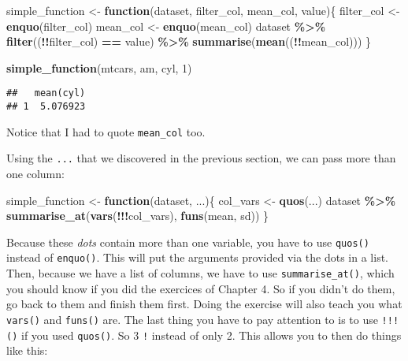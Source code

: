 \documentclass[
]{article}
\newenvironment{Shaded}{\begin{snugshade}}{\end{snugshade}}
\newcommand{\ControlFlowTok}[1]{\textcolor[rgb]{0.13,0.29,0.53}{\textbf{#1}}}
\newcommand{\DecValTok}[1]{\textcolor[rgb]{0.00,0.00,0.81}{#1}}
\newcommand{\KeywordTok}[1]{\textcolor[rgb]{0.13,0.29,0.53}{\textbf{#1}}}
\newcommand{\NormalTok}[1]{#1}
\newcommand{\OperatorTok}[1]{\textcolor[rgb]{0.81,0.36,0.00}{\textbf{#1}}}
\newcommand{\StringTok}[1]{\textcolor[rgb]{0.31,0.60,0.02}{#1}}
\begin{document}
\begin{Shaded}
\begin{Highlighting}[]
\NormalTok{simple\_function \textless{}{-}}\StringTok{ }\ControlFlowTok{function}\NormalTok{(dataset, filter\_col, mean\_col, value)\{}
\NormalTok{  filter\_col \textless{}{-}}\StringTok{ }\KeywordTok{enquo}\NormalTok{(filter\_col)}
\NormalTok{  mean\_col \textless{}{-}}\StringTok{ }\KeywordTok{enquo}\NormalTok{(mean\_col)}
\NormalTok{  dataset }\OperatorTok{\%\textgreater{}\%}
\StringTok{    }\KeywordTok{filter}\NormalTok{((}\OperatorTok{!!}\NormalTok{filter\_col) }\OperatorTok{==}\StringTok{ }\NormalTok{value) }\OperatorTok{\%\textgreater{}\%}
\StringTok{    }\KeywordTok{summarise}\NormalTok{(}\KeywordTok{mean}\NormalTok{((}\OperatorTok{!!}\NormalTok{mean\_col)))}
\NormalTok{\}}


\KeywordTok{simple\_function}\NormalTok{(mtcars, am, cyl, }\DecValTok{1}\NormalTok{)}
\end{Highlighting}
\end{Shaded}

\begin{verbatim}
##   mean(cyl)
## 1  5.076923
\end{verbatim}

Notice that I had to quote \texttt{mean\_col} too.

Using the \texttt{...} that we discovered in the previous section, we can pass more than one column:

\begin{Shaded}
\begin{Highlighting}[]
\NormalTok{simple\_function \textless{}{-}}\StringTok{ }\ControlFlowTok{function}\NormalTok{(dataset, ...)\{}
\NormalTok{  col\_vars \textless{}{-}}\StringTok{ }\KeywordTok{quos}\NormalTok{(...)}
\NormalTok{  dataset }\OperatorTok{\%\textgreater{}\%}
\StringTok{    }\KeywordTok{summarise\_at}\NormalTok{(}\KeywordTok{vars}\NormalTok{(}\OperatorTok{!!!}\NormalTok{col\_vars), }\KeywordTok{funs}\NormalTok{(mean, sd))}
\NormalTok{\}}
\end{Highlighting}
\end{Shaded}

Because these \emph{dots} contain more than one variable, you have to use \texttt{quos()} instead of \texttt{enquo()}.
This will put the arguments provided via the dots in a list. Then, because we have a list of
columns, we have to use \texttt{summarise\_at()}, which you should know if you did the exercices of
Chapter 4. So if you didn't do them, go back to them and finish them first. Doing the exercise will
also teach you what \texttt{vars()} and \texttt{funs()} are. The last thing you have to pay attention to is to
use \texttt{!!!()} if you used \texttt{quos()}. So 3 \texttt{!} instead of only 2. This allows you to then do things
like this:
\end{document}
